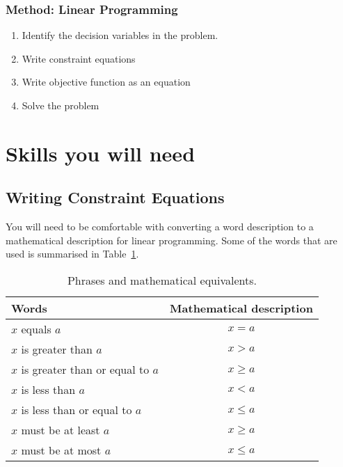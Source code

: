 \subsubsection{Method: Linear Programming}{
\begin{enumerate}
\item{Identify the decision variables in the problem.}
\item{Write constraint equations}
\item{Write objective function as an equation}
\item{Solve the problem}
\end{enumerate}}

\section{Skills you will need}
\subsection{Writing Constraint Equations}
You will need to be comfortable with converting a word description to a mathematical description for linear programming. Some of the words that are used is summarised in Table~\ref{m:lp11:language}.

\begin{table}[htbp]
\begin{center}
\caption{Phrases and mathematical equivalents.}
\label{m:lp11:language}
\begin{tabular}{|l|c|}\hline
Words & Mathematical description\\\hline\hline
$x$ equals $a$ & $x = a$ \\
$x$ is greater than $a$ & $x > a$\\
$x$ is greater than or equal to $a$ & $x \geq a$\\
$x$ is less than $a$ & $x < a$ \\
$x$ is less than or equal to $a$ & $x \leq a$ \\
$x$ must be at least $a$ & $x \geq a$ \\
$x$ must be at most $a$ & $x \leq a$\\\hline
\end{tabular}
\end{center}
\end{table}

